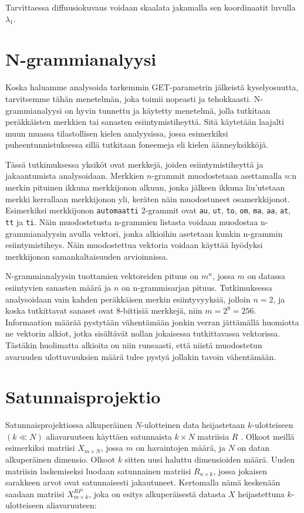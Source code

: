 Tarvittaessa diffuusiokuvaus voidaan skaalata jakamalla sen koordinaatit luvulla $\lambda_1$.

\section{N-grammianalyysi}


Koska haluamme analysoida tarkemmin GET-parametrin jälkeistä kyselyosuutta, tarvitsemme tähän menetelmän, joka toimii nopeasti ja tehokkaasti. N-\-grammianalyysi on hyvin tunnettu ja käytetty menetelmä, jolla tutkitaan 
peräkkäisten merkkien tai sanasten esiintymistiheyttä. Sitä käytetään laajalti muun muassa tilastollisen kielen analyysissa, jossa esimerkiksi puheentunnistuksessa sillä tutkitaan foneemeja eli kielen äänneyksikköjä. 

Tässä tutkimuksessa yksiköt ovat merkkejä, joiden esiintymistiheyttä ja jakaantumista analysoidaan. Merkkien $n$-grammit muodostetaan asettamalla $n$:n merkin pituinen ikkuna merkkijonon alkuun, jonka jälkeen ikkuna liu'utetaan merkki kerrallaan merkkijonon yli, keräten näin muodostuneet osamerkkijonot. Esimerkiksi merkkijonon \texttt{automaatti} 2-grammit ovat
\texttt{au},
\texttt{ut},
\texttt{to},
\texttt{om},
\texttt{ma},
\texttt{aa},
\texttt{at},
\texttt{tt} ja
\texttt{ti}.
Näin muodostetusta n-grammien listasta voidaan muodostaa n-grammianalyysin avulla vektori, jonka alkioihin asetetaan kunkin n-grammin esiintymistiheys. Näin muodostettua vektoria voidaan käyttää hyödyksi merkkijonon samankaltaisuuden arvioinnissa.

N-grammianalyysin tuottamien vektoreiden pituus on $m^n$, jossa $m$ on datassa esiintyvien sanasten määrä ja $n$ on n-grammisarjan pituus. Tutkimuksessa analysoidaan vain kahden peräkkäisen merkin esiintyvyyksiä, 
jolloin $n=2$, ja koska tutkittavat sanaset ovat 8-bittisiä merkkejä, niin $m=2^8=256$. Informaation määrää pystytään vähentämään jonkin verran jättämällä huomiotta ne vektorin alkiot, jotka sisältävät nollan jokaisessa tutkittavassa vektorissa. Tästäkin huolimatta alkioita on niin runsaasti, että niistä muodostetun avaruuden ulottuvuuksien määrä tulee pystyä jollakin tavoin vähentämään. 

\section{Satunnaisprojektio}

Satunnaisprojektiossa alkuperäinen $N$-ulotteinen data heijastetaan $k$-ulotteiseen $(k \ll N)$ aliavaruuteen käyttäen satunnaista $k \times N$ matriisia $R$ \cite{Random}. Olkoot meillä esimerkiksi matriisi 
$X_{m\times N}$, jossa $m$ on havaintojen määrä, ja $N$ on datan alkuperäinen dimensio. Olkoot  $k$  sitten uusi haluttu dimensioiden määrä. Uuden matriisin laskemiseksi luodaan satunnainen matriisi 
$R_{n \times k}$, jossa jokaisen sarakkeen arvot ovat satunnaisesti jakautuneet. Kertomalla nämä keskenään saadaan matriisi $X_{m \times k}^{RP}$, joka on esitys alkuperäisestä datasta $X$ heijastettuna $k$-ulotteiseen 
aliavaruuteen:

